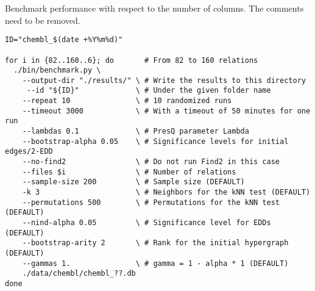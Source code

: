\begin{code}
\caption{Benchmark performance with respect to the number of columns. The comments need to be removed.}\label{script:perf_columns}
\begin{verbatim}
ID="chembl_$(date +%Y%m%d)"

for i in {82..160..6}; do       # From 82 to 160 relations
  ./bin/benchmark.py \
    --output-dir "./results/" \ # Write the results to this directory
     --id "${ID}"             \ # Under the given folder name
    --repeat 10               \ # 10 randomized runs
    --timeout 3000            \ # With a timeout of 50 minutes for one run
    --lambdas 0.1             \ # PresQ parameter Lambda
    --bootstrap-alpha 0.05    \ # Significance levels for initial edges/2-EDD
    --no-find2                \ # Do not run Find2 in this case
    --files $i                \ # Number of relations
    --sample-size 200         \ # Sample size (DEFAULT)
    -k 3                      \ # Neighbors for the kNN test (DEFAULT)
    --permutations 500        \ # Permutations for the kNN test (DEFAULT)
    --nind-alpha 0.05         \ # Significance level for EDDs (DEFAULT)
    --bootstrap-arity 2       \ # Rank for the initial hypergraph (DEFAULT)
    --gammas 1.               \ # gamma = 1 - alpha * 1 (DEFAULT)
    ./data/chembl/chembl_??.db
done
\end{verbatim}
\end{code}

